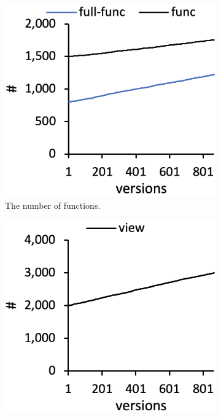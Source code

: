 \begin{figure}
  \centering
  \begin{subfigure}[b]{0.24\textwidth}
    \includegraphics[width=\textwidth]{img/func}
    \caption{The number of functions.}
  \end{subfigure}
  \begin{subfigure}[b]{0.24\textwidth}
    \includegraphics[width=\textwidth]{img/view}

\end{subfigure}
\end{figure}
